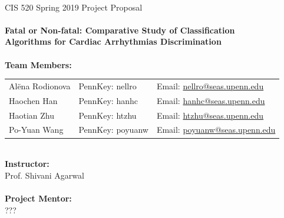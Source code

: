 \renewcommand{\headrulewidth}{0pt}
\renewcommand{\headrulewidth}{0pt}

\thispagestyle{fancy}
\mbox{}\vspace{1cm}\\
CIS 520 Spring 2019 Project Proposal\\
\\
{\Large \textbf{
Fatal or Non-fatal: Comparative Study of 
Classification \\Algorithms for Cardiac Arrhythmias Discrimination}} 
\\
\vspace{5cm}\\
%
%
%
\textbf{Team Members:}\\
%
\begin{tabular}{lll}%
	Al\"{e}na Rodionova & 
	PennKey: nellro &
	Email: 
	\href{mailto:nellro@seas.upenn.edu}{nellro@seas.upenn.edu} \\
	Haochen Han & 
	PennKey: hanhc& 
	Email: \href{mailto:hanhc@seas.upenn.edu}{hanhc@seas.upenn.edu}\\
	Haotian Zhu &
	PennKey: htzhu& 
	Email: \href{mailto:htzhu@seas.upenn.edu}{htzhu@seas.upenn.edu}\\
	Po-Yuan Wang & 
	PennKey: poyuanw & 
	Email:
	\href{mailto:poyuanw@seas.upenn.edu}{poyuanw@seas.upenn.edu}
\end{tabular}
\vspace{1cm}\\
\textbf{Instructor:}\\
Prof. Shivani Agarwal\\
%
\vspace{1cm}\\
\textbf{Project Mentor:}\\
???

\newpage